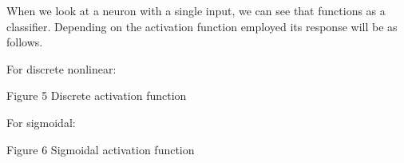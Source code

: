 \documentclass[10pt,oneside]{memoir}
\begin{document}
When we look at a neuron with a single input, we can see that functions as a classifier. Depending on the activation function employed its response will be as follows.


For discrete nonlinear:


\begin{figure}
\begin{center}
\end{center}
\label{figure5}
\end{figure}

Figure 5 Discrete activation function


For sigmoidal:


\begin{figure}
\begin{center}
\end{center}
\label{figure6}
\end{figure}

Figure 6 Sigmoidal activation function
\end{document}
